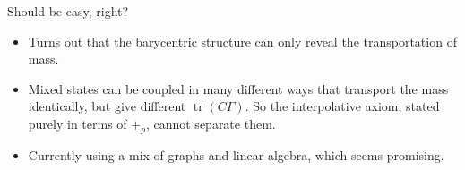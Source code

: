 \documentclass[10pt,aspectratio=169]{beamer}
\newcommand{\bpl}[1]{+_{#1}}
\begin{document}
                \begin{frame}{Should be easy, right?}
                    \begin{itemize}
                        \item[--] Turns out that the barycentric
                            structure can only reveal
                            the transportation of mass.
                            \medskip
                        \item[--] Mixed states can be coupled in
                            many different ways that
                            transport the mass identically, but
                            give different
                            $\operatorname{tr}(C\Gamma)$.
                            \medskip
                            {\small So the
                                interpolative axiom, stated
                                purely in terms of $\bpl{p}$,
                            cannot separate them. }
                            \medskip
                        \item[--] Currently using a mix of graphs
                            and linear algebra, which
                            seems promising.
                    \end{itemize}
                \end{frame}

\end{document}

